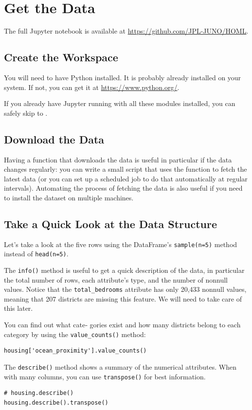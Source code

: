 \section{Get the Data}
The full Jupyter notebook is available at \url{https://github.com/JPL-JUNO/HOML}.
\subsection{Create the Workspace}
You will need to have Python installed. It is probably already installed on your
system. If not, you can get it at \url{https://www.python.org/}.

If you already have Jupyter running with all these modules installed,
you can safely skip to .
\subsection{Download the Data\label{Download the Data}}

Having a function that downloads the data is useful in particular if the
data changes regularly: you can write a small script that uses the function to fetch the
latest data (or you can set up a scheduled job to do that automatically at regular intervals). Automating the process of fetching the data is also useful if you need to install
the dataset on multiple machines.

\subsection{Take a Quick Look at the Data Structure}
Let's take a look at the five rows using the DataFrame's \verb|sample(n=5)| method instead of \verb|head(n=5)|.

The \verb|info()| method is useful to get a quick description of the data, in particular the
total number of rows, each attribute's type, and the number of nonnull values. Notice that the 
\verb|total_bedrooms| attribute has only 20,433 nonnull values, meaning that 207 districts are missing
this feature. We will need to take care of this later.

You can find out what cate‐
gories exist and how many districts belong to each category by using the
\verb|value_counts()| method:

\begin{verbatim}
housing['ocean_proximity'].value_counts()
\end{verbatim}

The \verb|describe()| method shows a summary of the
numerical attributes. When with many columns, you can use \verb|transpose()| for best information.
\begin{verbatim}
# housing.describe()
housing.describe().transpose()
\end{verbatim}


